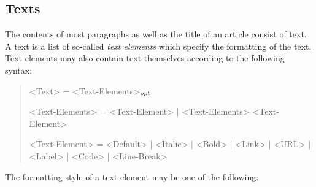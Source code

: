 \subsection{Texts}

The contents of most paragraphs as well as the title of an article consist of text.
A text is a list of so-called \emph{text elements} which specify the formatting of the text.
Text elements may also contain text themselves according to the following syntax:

\begin{quote}\begin{grammar}
<Text> = <Text-Elements>$_\mathit{opt}$ \par
<Text-Elements> = <Text-Element> $\mid$ <Text-Elements> <Text-Element> \par
<Text-Element> = <Default> $\mid$ <Italic> $\mid$ <Bold> $\mid$ <Link> $\mid$ <URL> $\mid$ <Label> $\mid$ <Code> $\mid$ <Line-Break> \par
\end{grammar}\end{quote}

The formatting style of a text element may be one of the following:

